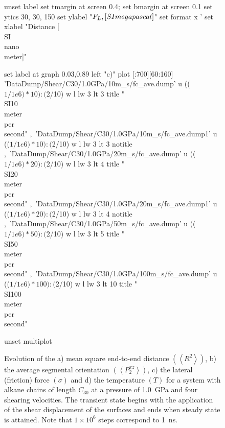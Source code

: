 \documentclass[5p]{elsarticle}
\begin{document}
\begin{figure}[htp]
\begin{center}
\begin{gnuplot}[terminal=epslatex, terminaloptions={size \SERFigwidth cm, \SERFigheight cm color solid}]
			unset label
			set tmargin at screen 0.4; set bmargin at screen 0.1
			set ytics 30, 30, 150 
			set ylabel "$F_L \\, [\\SI{}{\\mega\\pascal}]$" 
			set format x '%
			set xlabel "Distance [\\SI{}{\\nano\\meter}]"  

			set label at graph 0.03,0.89 left "c)"
			plot  [:700][60:160]	'DataDump/Shear/C30/1.0GPa/10m_s/fc_ave.dump' u (($1/1e6)*10):($2/10) w l  lw 3    lt 3    title  "\\SI{10}{\\meter\\per\\second}"   ,\
			'DataDump/Shear/C30/1.0GPa/10m_s/fc_ave.dump1' u (($1/1e6)*10):($2/10) w l  lw 3    lt 3    notitle    ,\
							'DataDump/Shear/C30/1.0GPa/20m_s/fc_ave.dump' u (($1/1e6)*20):($2/10) w l  lw 3    lt 4    title  "\\SI{20}{\\meter\\per\\second}"   ,\
							'DataDump/Shear/C30/1.0GPa/20m_s/fc_ave.dump1' u (($1/1e6)*20):($2/10) w l  lw 3    lt 4    notitle    ,\
							'DataDump/Shear/C30/1.0GPa/50m_s/fc_ave.dump' u (($1/1e6)*50):($2/10) w l  lw 3     lt 5    title  "\\SI{50}{\\meter\\per\\second}"  ,\
							'DataDump/Shear/C30/1.0GPa/100m_s/fc_ave.dump' u (($1/1e6)*100):($2/10) w l  lw 3   lt 10    title  "\\SI{100}{\\meter\\per\\second}"  

			unset multiplot
		\end{gnuplot}

		\caption{Evolution of the a) mean square end-to-end distance $\left(\left< R^2 \right>\right)$, b) the average segmental orientation  $\left(\left<P_{2}^{xz}\right>\right)$, c) the lateral (friction) force  $\left(\sigma\right)$ and d) the temperature $\left(T\right)$ for a system with alkane chains of length $C_{30}$ at a pressure of \SI{1.0}{\giga\pascal} and four  shearing velocities. The transient state begins with the application of the shear displacement of the surfaces and ends when  steady state is attained. Note that $1 \times 10^{6}$ steps correspond to \SI{1}{\nano\second}.}
		\label{fig:SS}
	\end{center}
 \end{figure}
\end{document}
